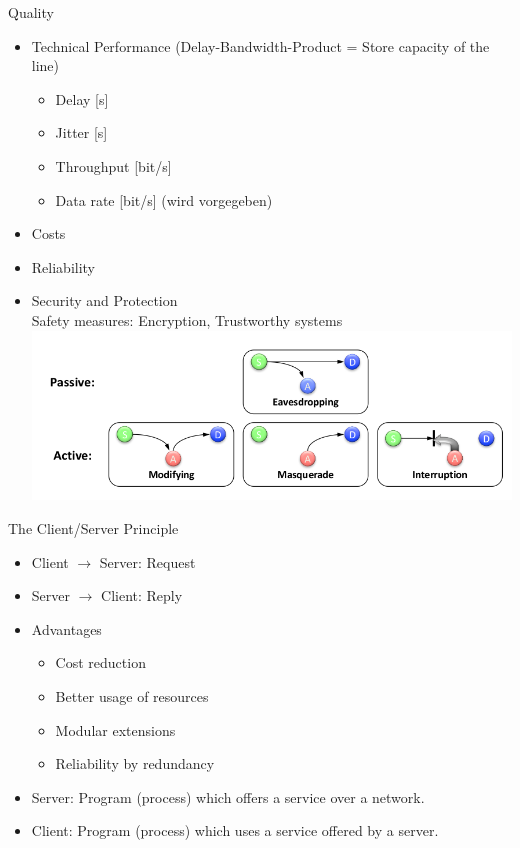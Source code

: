 \documentclass[11pt,ngerman]{article}
\begin{document}
Quality\\
\begin{itemize}[noitemsep]
	\item Technical	Performance (Delay-Bandwidth-Product	=	
Store	capacity of	the	line)
	\begin{itemize}[noitemsep]
		\item Delay	[s]
		\item Jitter	[s]
		\item Throughput	[bit/s]
		\item Data	rate	[bit/s] (wird vorgegeben)
	\end{itemize}
	\item Costs
	\item Reliability
	\item Security	and	Protection\\
		Safety measures: Encryption, Trustworthy	systems	\\
	\includegraphics[width=5in]{images/Selection_005.png}
\end{itemize}


The	Client/Server	Principle
\begin{itemize}[noitemsep]
	\item Client $\rightarrow$ Server: Request
	\item Server $\rightarrow$ Client: Reply 
\end{itemize}
\begin{itemize}[noitemsep]
	\item Advantages
	\begin{itemize}[noitemsep]  
	\item Cost	reduction
	\item Better	usage	of	resources
	\item Modular	extensions
	\item Reliability	by	redundancy
	 \end{itemize}
	\item Server: Program	(process)	which	offers	a	service	over	a	network.	
	\item Client: Program	(process)	which	uses	a	service	offered	by	a	server.
\end{itemize}
\end{document}
